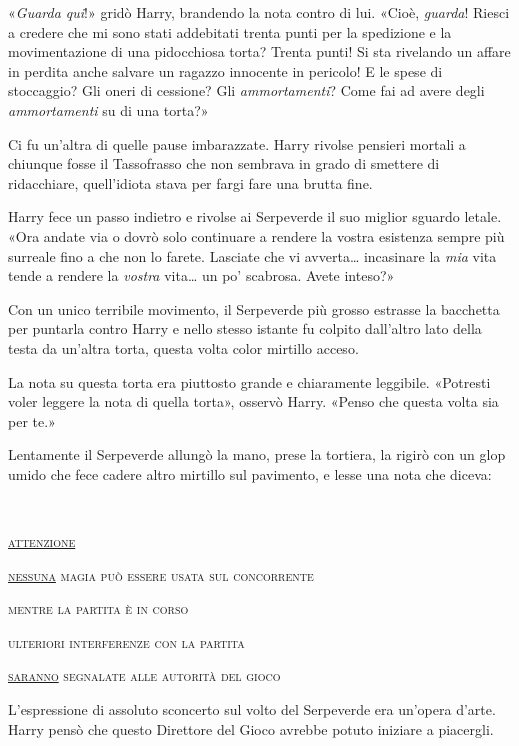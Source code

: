 «\textit{Guarda qui}!» gridò Harry, brandendo la nota contro di lui. «Cioè, \textit{guarda}! Riesci a credere che mi sono stati addebitati trenta punti per la spedizione e la movimentazione di una pidocchiosa torta? Trenta punti! Si sta rivelando un affare in perdita anche salvare un ragazzo innocente in pericolo! E le spese di stoccaggio? Gli oneri di cessione? Gli \textit{ammortamenti}? Come fai ad avere degli \textit{ammortamenti} su di una torta?»

Ci fu un’altra di quelle pause imbarazzate. Harry rivolse pensieri mortali a chiunque fosse il Tassofrasso che non sembrava in grado di smettere di ridacchiare, quell’idiota stava per fargi fare una brutta fine.

Harry fece un passo indietro e rivolse ai Serpeverde il suo miglior sguardo letale. «Ora andate via o dovrò solo continuare a rendere la vostra esistenza sempre più surreale fino a che non lo farete. Lasciate che vi avverta… incasinare la \textit{mia} vita tende a rendere la \textit{vostra} vita… un po’ scabrosa. Avete inteso?»

Con un unico terribile movimento, il Serpeverde più grosso estrasse la bacchetta per puntarla contro Harry e nello stesso istante fu colpito dall’altro lato della testa da un’altra torta, questa volta color mirtillo acceso.

La nota su questa torta era piuttosto grande e chiaramente leggibile. «Potresti voler leggere la nota di quella torta», osservò Harry. «Penso che questa volta sia per te.»

Lentamente il Serpeverde allungò la mano, prese la tortiera, la rigirò con un glop umido che fece cadere altro mirtillo sul pavimento, e lesse una nota che diceva:


\begin{addmargin}[3em]{3em}%
~
\begin{center}
\textsc{\underline{attenzione}}

\textsc{\underline{nessuna} magia può essere usata sul concorrente}

\textsc{mentre la partita è in corso}

\textsc{ulteriori interferenze con la partita}

\textsc{\underline{saranno} segnalate alle autorità del gioco}\\
\end{center}
\end{addmargin}

L’espressione di assoluto sconcerto sul volto del Serpeverde era un’opera d’arte. Harry pensò che questo Direttore del Gioco avrebbe potuto iniziare a piacergli.


